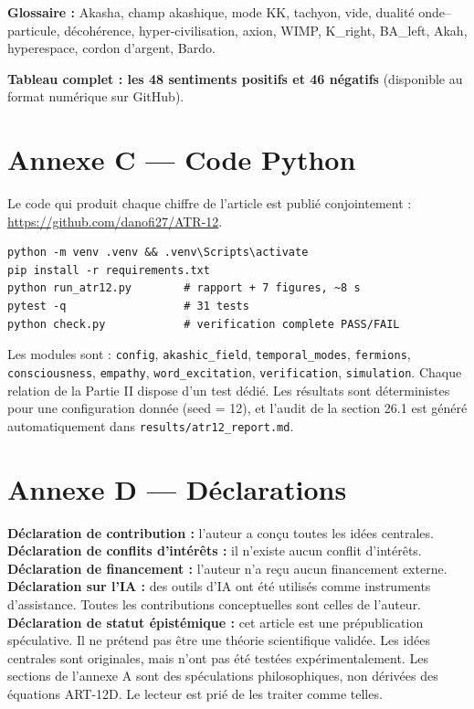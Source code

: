 \textbf{Glossaire :} Akasha, champ akashique, mode KK, tachyon, vide, dualité onde--particule, décohérence, hyper-civilisation, axion, WIMP, K\_right, BA\_left, Akah, hyperespace, cordon d'argent, Bardo.

\textbf{Tableau complet : les 48 sentiments positifs et 46 négatifs} (disponible au format numérique sur GitHub).

\section{Annexe C --- Code Python}
Le code qui produit chaque chiffre de l'article est publié conjointement : \url{https://github.com/danofi27/ATR-12}.

\begin{verbatim}
python -m venv .venv && .venv\Scripts\activate
pip install -r requirements.txt
python run_atr12.py        # rapport + 7 figures, ~8 s
pytest -q                  # 31 tests
python check.py            # verification complete PASS/FAIL
\end{verbatim}

Les modules sont : \texttt{config}, \texttt{akashic\_field}, \texttt{temporal\_modes}, \texttt{fermions}, \texttt{consciousness}, \texttt{empathy}, \texttt{word\_excitation}, \texttt{verification}, \texttt{simulation}. Chaque relation de la Partie II dispose d'un test dédié. Les résultats sont déterministes pour une configuration donnée (seed = 12), et l'audit de la section 26.1 est généré automatiquement dans \texttt{results/atr12\_report.md}.

\section{Annexe D --- Déclarations}
\textbf{Déclaration de contribution :} l'auteur a conçu toutes les idées centrales. \\
\textbf{Déclaration de conflits d'intérêts :} il n'existe aucun conflit d'intérêts. \\
\textbf{Déclaration de financement :} l'auteur n'a reçu aucun financement externe. \\
\textbf{Déclaration sur l'IA :} des outils d'IA ont été utilisés comme instruments d'assistance. Toutes les contributions conceptuelles sont celles de l'auteur. \\
\textbf{Déclaration de statut épistémique :} cet article est une prépublication spéculative. Il ne prétend pas être une théorie scientifique validée. Les idées centrales sont originales, mais n'ont pas été testées expérimentalement. Les sections de l'annexe A sont des spéculations philosophiques, non dérivées des équations ART-12D. Le lecteur est prié de les traiter comme telles.

